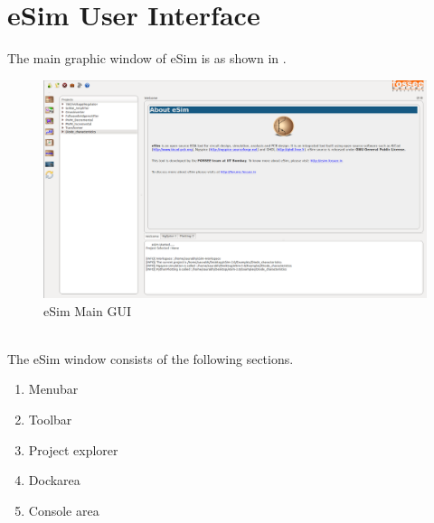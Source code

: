 \section{eSim User Interface}
The main graphic window of eSim is as shown in .
\begin{figure}[h]
\centering
\includegraphics[width=\hgfig]{maingui.png}
\caption{eSim Main GUI}
\label{maingui}
\end{figure}
\\
The eSim window consists of the following sections.
\begin{enumerate}

\item Menubar
\item Toolbar
\item Project explorer
\item Dockarea
\item Console area
\end{enumerate}

